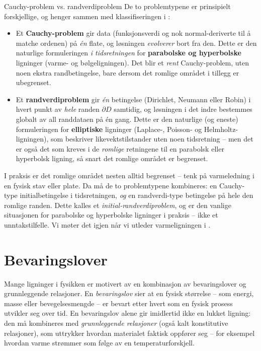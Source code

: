 \begin{oppsum}{Cauchy-problem vs. randverdiproblem}\label{oppsum:cauchyRVP}
De to problemtypene er prinsipielt forskjellige, og henger sammen med klassifiseringen i :
\begin{itemize}
\item Et \textbf{Cauchy-problem} gir data (funksjonsverdi og nok normal-deriverte til å matche ordenen) på \emph{én} flate, og løsningen \emph{evolverer} bort fra den. Dette er den naturlige formuleringen \emph{i tidsretningen} for \textbf{parabolske og hyperbolske} ligninger (varme- og bølgeligningen). Det blir et \emph{rent} Cauchy-problem, uten noen ekstra randbetingelse, bare dersom det romlige området i tillegg er ubegrenset.
\item Et \textbf{randverdiproblem} gir \emph{én} betingelse (Dirichlet, Neumann eller Robin) i hvert punkt av \emph{hele} randen $\partial D$ samtidig, og løsningen i det indre bestemmes globalt av all randdataen på én gang. Dette er den naturlige (og eneste) formuleringen for \textbf{elliptiske} ligninger (Laplace-, Poisson- og Helmholtz-ligningen), som beskriver likevektstilstander uten noen tidsretning -- men det er også det som kreves i de \emph{romlige} retningene til en parabolsk eller hyperbolsk ligning, så snart det romlige området er begrenset.
\end{itemize}
\end{oppsum}
I praksis er det romlige området nesten alltid begrenset -- tenk på varmeledning i en fysisk stav eller plate. Da må de to problemtypene kombineres: en Cauchy-type initialbetingelse i tidsretningen, \emph{og} en randverdi-type betingelse på hele den romlige randen. Dette kalles et \emph{initial-randverdiproblem}, og er den vanlige situasjonen for parabolske og hyperbolske ligninger i praksis -- ikke et unntakstilfelle. Vi møter det igjen når vi utleder varmeligningen i .

\section{Bevaringslover}\label{sect:bevaringslover}

Mange ligninger i fysikken er motivert av en kombinasjon av bevaringslover og grunnleggende relasjoner. En \emph{bevaringslov} sier at en fysisk størrelse -- som energi, masse eller bevegelsesmengde -- er bevart etter hvert som en fysisk prosess utvikler seg over tid. En bevaringslov alene gir imidlertid ikke en lukket ligning: den må kombineres med \emph{grunnleggende relasjoner} (også kalt konstitutive relasjoner), som uttrykker hvordan materialet faktisk oppfører seg -- for eksempel hvordan varme strømmer som følge av en temperaturforskjell.


